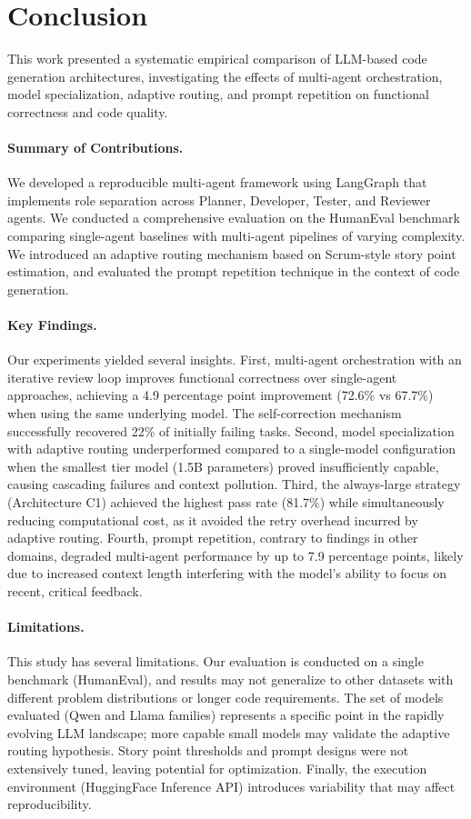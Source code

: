 \section{Conclusion}
\label{sec:conclusion}

This work presented a systematic empirical comparison of LLM-based code generation architectures, investigating the effects of multi-agent orchestration, model specialization, adaptive routing, and prompt repetition on functional correctness and code quality.

\paragraph{Summary of Contributions.}
We developed a reproducible multi-agent framework using LangGraph that implements role separation across Planner, Developer, Tester, and Reviewer agents. We conducted a comprehensive evaluation on the HumanEval benchmark comparing single-agent baselines with multi-agent pipelines of varying complexity. We introduced an adaptive routing mechanism based on Scrum-style story point estimation, and evaluated the prompt repetition technique in the context of code generation.

\paragraph{Key Findings.}
Our experiments yielded several insights. First, multi-agent orchestration with an iterative review loop improves functional correctness over single-agent approaches, achieving a 4.9 percentage point improvement (72.6\% vs 67.7\%) when using the same underlying model. The self-correction mechanism successfully recovered 22\% of initially failing tasks. Second, model specialization with adaptive routing underperformed compared to a single-model configuration when the smallest tier model (1.5B parameters) proved insufficiently capable, causing cascading failures and context pollution. Third, the always-large strategy (Architecture C1) achieved the highest pass rate (81.7\%) while simultaneously reducing computational cost, as it avoided the retry overhead incurred by adaptive routing. Fourth, prompt repetition, contrary to findings in other domains, degraded multi-agent performance by up to 7.9 percentage points, likely due to increased context length interfering with the model's ability to focus on recent, critical feedback.

\paragraph{Limitations.}
This study has several limitations. Our evaluation is conducted on a single benchmark (HumanEval), and results may not generalize to other datasets with different problem distributions or longer code requirements. The set of models evaluated (Qwen and Llama families) represents a specific point in the rapidly evolving LLM landscape; more capable small models may validate the adaptive routing hypothesis. Story point thresholds and prompt designs were not extensively tuned, leaving potential for optimization. Finally, the execution environment (HuggingFace Inference API) introduces variability that may affect reproducibility.

